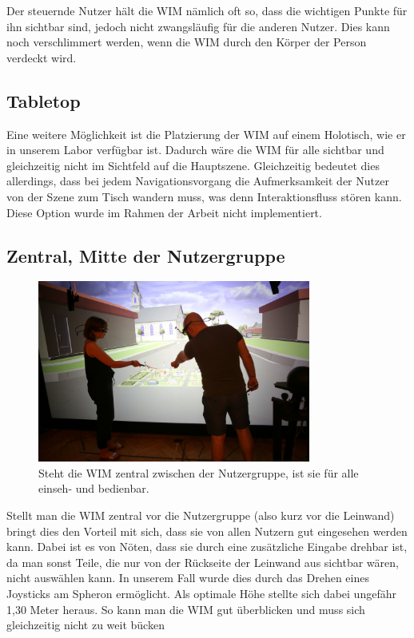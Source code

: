 Der steuernde Nutzer hält die WIM nämlich oft so, dass die wichtigen Punkte für ihn sichtbar sind, jedoch nicht zwangsläufig für die anderen Nutzer. Dies kann noch verschlimmert werden, wenn die WIM durch den Körper der Person verdeckt wird.


\subsection{Tabletop}
Eine weitere Möglichkeit ist die Platzierung der WIM auf einem Holotisch, wie er in unserem Labor verfügbar ist.
Dadurch wäre die WIM für alle sichtbar und gleichzeitig nicht im Sichtfeld auf die Hauptszene. Gleichzeitig bedeutet dies allerdings, dass bei jedem Navigationsvorgang die Aufmerksamkeit der Nutzer von der Szene zum Tisch wandern muss, was denn Interaktionsfluss stören kann. Diese Option wurde im Rahmen der Arbeit nicht implementiert.

\subsection{Zentral, Mitte der Nutzergruppe}


\begin{figure}[h!]
  \centering
  \includegraphics[width=0.8\textwidth]{images/wim_zentral.JPG}
  \caption{Steht die WIM zentral zwischen der Nutzergruppe, ist sie für alle einseh- und bedienbar.}
  \label{fig:todo}
\end{figure}

Stellt man die WIM zentral vor die Nutzergruppe (also kurz vor die Leinwand) bringt dies den Vorteil mit sich, dass sie von allen Nutzern gut eingesehen werden kann.
Dabei ist es von Nöten, dass sie durch eine zusätzliche Eingabe drehbar ist, da man sonst Teile, die nur von der Rückseite der Leinwand aus sichtbar wären, nicht auswählen kann.
In unserem Fall wurde dies durch das Drehen eines Joysticks am Spheron ermöglicht.
Als optimale Höhe stellte sich dabei ungefähr 1,30 Meter heraus. So kann man die WIM gut überblicken und muss sich gleichzeitig nicht zu weit bücken

